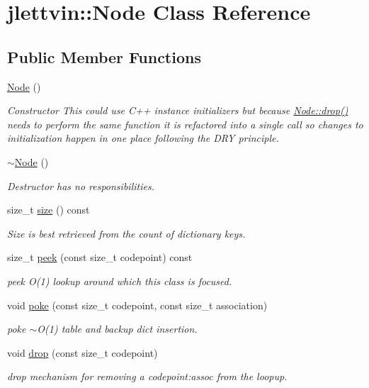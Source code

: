 \hypertarget{classjlettvin_1_1_node}{}\section{jlettvin\+:\+:Node Class Reference}
\label{classjlettvin_1_1_node}
\subsection*{Public Member Functions}
\begin{DoxyCompactItemize}
\item 
\hyperlink{classjlettvin_1_1_node_ad7a34779cad45d997bfd6d3d8043c75f}{Node} ()
\begin{DoxyCompactList}\small\item\em Constructor This could use C++ instance initializers but because \hyperlink{classjlettvin_1_1_node_aa2cf237ff4b2d21d7439ccf2c56185db}{Node\+::drop()} needs to perform the same function it is refactored into a single call so changes to initialization happen in one place following the D\+R\+Y principle. \end{DoxyCompactList}\item 
\hyperlink{classjlettvin_1_1_node_aa0840c3cb5c7159be6d992adecd2097c}{$\sim$\+Node} ()
\begin{DoxyCompactList}\small\item\em Destructor has no responsibilities. \end{DoxyCompactList}\item 
size\+\_\+t \hyperlink{classjlettvin_1_1_node_ae2983972c965d0875ea34aa15aee2564}{size} () const 
\begin{DoxyCompactList}\small\item\em Size is best retrieved from the count of dictionary keys. \end{DoxyCompactList}\item 
size\+\_\+t \hyperlink{classjlettvin_1_1_node_af3e572b02d7675ddb110566c2d25ef10}{peek} (const size\+\_\+t codepoint) const 
\begin{DoxyCompactList}\small\item\em peek O(1) lookup around which this class is focused. \end{DoxyCompactList}\item 
void \hyperlink{classjlettvin_1_1_node_a0710c9ba361bc74e0c49b6acf3af4b39}{poke} (const size\+\_\+t codepoint, const size\+\_\+t association)
\begin{DoxyCompactList}\small\item\em poke $\sim$\+O(1) table and backup dict insertion. \end{DoxyCompactList}\item 
void \hyperlink{classjlettvin_1_1_node_aa2cf237ff4b2d21d7439ccf2c56185db}{drop} (const size\+\_\+t codepoint)
\begin{DoxyCompactList}\small\item\em drop mechanism for removing a codepoint\+:assoc from the loopup. \end{DoxyCompactList}\end{DoxyCompactItemize}



